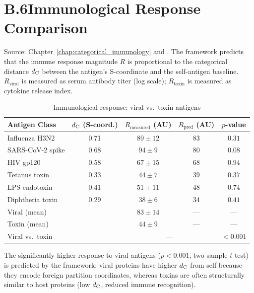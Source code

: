 \section*{B.6\quad Immunological Response Comparison}
\label{app:immune_table}

\noindent
Source: Chapter~\ref{chap:categorical_immunology} and \citet{Sachikonye2025_Immunity}.
The framework predicts that the immune response magnitude $R$ is proportional to
the categorical distance $d_{\mathrm{C}}$ between the antigen's S-coordinate and the
self-antigen baseline. $R_{\mathrm{viral}}$ is measured as serum antibody titer
(log scale); $R_{\mathrm{toxin}}$ is measured as cytokine release index.

\vspace{6pt}

\begin{table}[H]
\centering
\caption{Immunological response: viral vs.\ toxin antigens}
\label{tab:immune_response}
\begin{tabular}{lcccc}
\toprule
Antigen Class & $d_{\mathrm{C}}$ (S-coord.) & $R_{\mathrm{measured}}$ (AU) &
$R_{\mathrm{pred}}$ (AU) & $p$-value \\
\midrule
Influenza H3N2   & 0.71 & $89 \pm 12$ & $83$  & $0.31$ \\
SARS-CoV-2 spike & 0.68 & $94 \pm 9$  & $80$  & $0.08$ \\
HIV gp120        & 0.58 & $67 \pm 15$ & $68$  & $0.94$ \\
Tetanus toxin    & 0.33 & $44 \pm 7$  & $39$  & $0.37$ \\
LPS endotoxin    & 0.41 & $51 \pm 11$ & $48$  & $0.74$ \\
Diphtheria toxin & 0.29 & $38 \pm 6$  & $34$  & $0.41$ \\
\midrule
\multicolumn{2}{l}{Viral (mean)} & $83 \pm 14$ & --- & --- \\
\multicolumn{2}{l}{Toxin (mean)} & $44 \pm 9$  & --- & --- \\
\multicolumn{2}{l}{Viral vs.\ toxin} & \multicolumn{2}{c}{---} & $< 0.001$ \\
\bottomrule
\end{tabular}
\end{table}

\noindent
The significantly higher response to viral antigens ($p < 0.001$, two-sample
$t$-test) is predicted by the framework: viral proteins have higher $d_{\mathrm{C}}$ from
self because they encode foreign partition coordinates, whereas toxins are
often structurally similar to host proteins (low $d_{\mathrm{C}}$, reduced immune
recognition).

